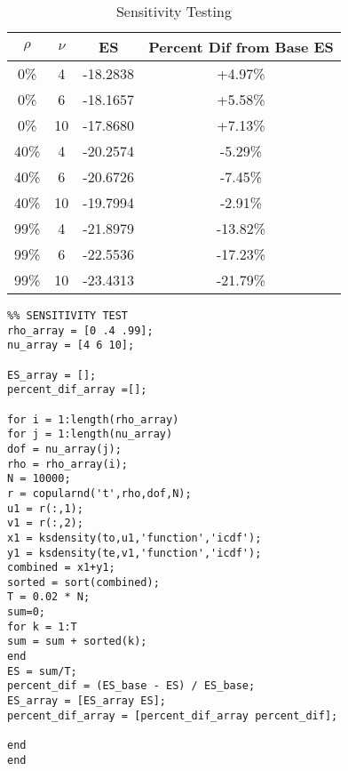 \documentclass[titlepage]{article}
\begin{document}
\begin{table}[ht]
	\centering
	\begin{tabular}{c c c c}
	\hline\hline
	$\rho$ & $\nu$ & ES & Percent Dif from Base ES \\ [0.5ex]
	\hline
	0\% & 4 & -18.2838 & +4.97\%\\ 
	0\% & 6 & -18.1657 & +5.58\%\\
	0\% & 10 & -17.8680 & +7.13\%\\
	40\% & 4 & -20.2574 & -5.29\%\\
	40\% & 6 & -20.6726 & -7.45\%\\
	40\% & 10 & -19.7994 & -2.91\%\\
	99\% & 4 & -21.8979 & -13.82\%\\
	99\% & 6 & -22.5536 & -17.23\%\\
	99\% & 10 & -23.4313 & -21.79\%\\
	\hline
	\end{tabular}
	\caption{Sensitivity Testing}
	\label{table:stest}
\end{table}


\begin{verbatim}
%% SENSITIVITY TEST
rho_array = [0 .4 .99];
nu_array = [4 6 10];

ES_array = [];
percent_dif_array =[];

for i = 1:length(rho_array)
for j = 1:length(nu_array)
dof = nu_array(j);
rho = rho_array(i);
N = 10000;
r = copularnd('t',rho,dof,N);
u1 = r(:,1);
v1 = r(:,2);
x1 = ksdensity(to,u1,'function','icdf');
y1 = ksdensity(te,v1,'function','icdf');
combined = x1+y1;
sorted = sort(combined);
T = 0.02 * N;
sum=0;
for k = 1:T
sum = sum + sorted(k);
end
ES = sum/T;
percent_dif = (ES_base - ES) / ES_base;
ES_array = [ES_array ES];
percent_dif_array = [percent_dif_array percent_dif]; 

end
end
\end{verbatim}
\end{document}
